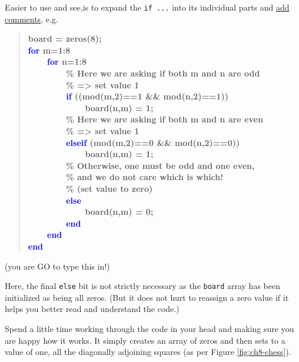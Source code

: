 \documentclass{tufte-book} %
\newenvironment{docspecbold}{\begin{quotation}\ttfamily\bfseries\parskip0pt\parindent0pt\ignorespaces}{\end{quotation}}
\begin{document}
\noindent Easier to use and see,is to expand the \texttt{if ...} into its individual parts and \uline{add comments}, e.g.
\begin{docspecbold}
board = zeros(8);
\\\textcolor{blue}{for} m=1:8
\\ \ \ \ \ \textcolor{blue}{for} n=1:8
\\ \ \ \ \ \ \ \ \ \textcolor[rgb]{0,0.501961,0}{\% Here we are asking if both m and n are odd}
\\ \ \ \ \ \ \ \ \ \textcolor[rgb]{0,0.501961,0}{\% => set value 1}
\\ \ \ \ \ \ \ \ \ \textcolor{blue}{if} ((mod(m,2)==1 \&\& mod(n,2)==1))
\\ \ \ \ \ \ \ \ \ \ \ \ \ board(n,m) = 1;
\\ \ \ \ \ \ \ \ \ \textcolor[rgb]{0,0.501961,0}{\% Here we are asking if both m and n are even}
\\ \ \ \ \ \ \ \ \ \textcolor[rgb]{0,0.501961,0}{\% => set value 1}
\\ \ \ \ \ \ \ \ \ \textcolor{blue}{elseif} (mod(m,2)==0 \&\& mod(n,2)==0))
\\ \ \ \ \ \ \ \ \ \ \ \ \ board(n,m) = 1;
\\ \ \ \ \ \ \ \ \ \textcolor[rgb]{0,0.501961,0}{\% Otherwise, one must be odd and one even,}
\\ \ \ \ \ \ \ \ \ \textcolor[rgb]{0,0.501961,0}{\% and we do not care which is which!}
\\ \ \ \ \ \ \ \ \ \textcolor[rgb]{0,0.501961,0}{\% (set value to zero)}
\\ \ \ \ \ \ \ \ \ \textcolor{blue}{else}
\\ \ \ \ \ \ \ \ \ \ \ \ \ board(n,m) = 0;
\\ \ \ \ \ \ \ \ \ \textcolor{blue}{end}
\\ \ \ \ \ \textcolor{blue}{end}
\\\textcolor{blue}{end}
\end{docspecbold}
\vspace{-2mm}
(you are GO to type this in!)

\vspace{1mm}
Here, the final \texttt{else} bit is not strictly necessary as the \texttt{board} array has been initialized as being all zeros. (But it does not hurt to reassign a zero value if it helps you better read and understand the code.)

Spend a little time working through the code in your head and making sure you are happy how it works. It simply creates an array of zeros and then sets to a value of one, all the diagonally adjoining squares (as per Figure \ref{fig:ch8-chess}).
\end{document}
